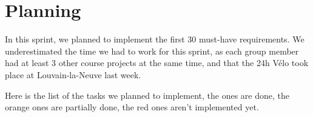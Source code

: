 \section{Planning}

In this sprint, we planned to implement the first 30 must-have requirements. We underestimated the time we had to work for this sprint, as each group member had at least 3
other course projects at the same time, and that the 24h Vélo took place at Louvain-la-Neuve last week. \newline

Here is the list of the tasks we planned to implement, the
\color{green!60!black}{green} \color{black}ones are done,
the \color{orange!80!black} orange \color{black} ones are partially done, the
\color{red!80!black}red \color{black} ones aren't implemented yet.

